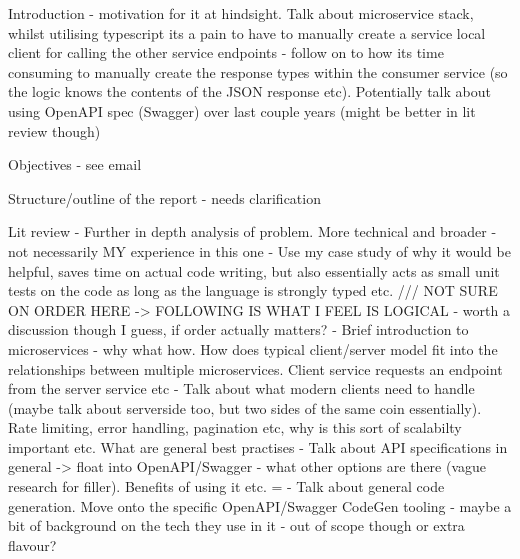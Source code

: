 Introduction - motivation for it at hindsight. Talk about microservice stack, whilst utilising typescript its a pain to have to manually create a service local client for calling the other service endpoints - follow on to how its time consuming to manually create
the response types within the consumer service (so the logic knows the contents of the JSON response etc). Potentially talk about using OpenAPI spec (Swagger) over last couple years (might be better in lit review though)

Objectives - see email

Structure/outline of the report - needs clarification

Lit review
	- Further in depth analysis of problem. More technical and broader - not necessarily MY experience in this one
	- Use my case study of why it would be helpful, saves time on actual code writing, but also essentially acts as small unit tests on the code as long as the language is strongly typed etc.
	/// NOT SURE ON ORDER HERE -> FOLLOWING IS WHAT I FEEL IS LOGICAL - worth a discussion though I guess, if order actually matters?
	- Brief introduction to microservices - why what how. How does typical client/server model fit into the relationships between multiple microservices. Client service requests an endpoint from the server service etc
	- Talk about what modern clients need to handle (maybe talk about serverside too, but two sides of the same coin essentially). Rate limiting, error handling, pagination etc, why is this sort of scalabilty
	important etc. What are general best practises
	- Talk about API specifications in general -> float into OpenAPI/Swagger - what other options are there (vague research for filler). Benefits of using it etc. =
	- Talk about general code generation. Move onto the specific OpenAPI/Swagger CodeGen tooling - maybe a bit of background on the tech they use in it - out of scope though or extra flavour?

